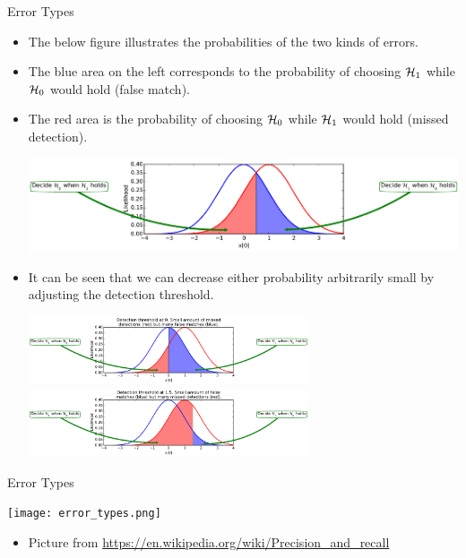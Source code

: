 \documentclass[10pt, aspectratio=169]{beamer} %
\begin{document}
\begin{frame}[allowframebreaks=0.8]
 {Error Types}
\begin{itemize}

\item The below figure illustrates the probabilities of the two kinds of
errors. 
\item The blue area on the left corresponds to the probability of
choosing ${\cal H}_1$ while ${\cal H}_0$ would hold (false match). 
\item 
The red area is the probability
of choosing  ${\cal H}_0$ while ${\cal H}_1$ would hold (missed detection).

\centerline{\includegraphics[width=\textwidth]{errorTypes1.pdf}}


\item It can be seen that we can decrease either probability arbitrarily small
by adjusting the detection threshold.

\begin{center}
\includegraphics[width=0.65\textwidth]{errorTypes2.pdf}\\
\includegraphics[width=0.65\textwidth]{errorTypes3.pdf}
\end{center}
\end{itemize}
\end{frame}

\begin{frame}[allowframebreaks=0.8]
 {Error Types}
\begin{center}
\texttt{[image: error\_types.png]}
\end{center}
{\tiny
\begin{itemize}
\item Picture from \url{https://en.wikipedia.org/wiki/Precision_and_recall}
\end{itemize}
}
\end{frame}
\end{document}
